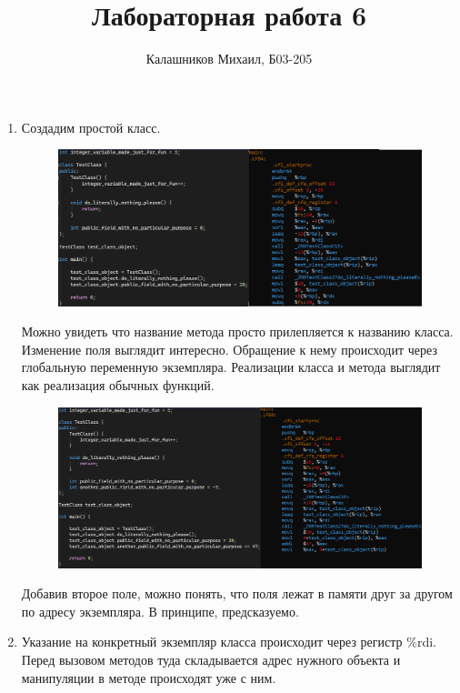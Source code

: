 \documentclass[a4paper,12pt]{article}
\title{Лабораторная работа 6}
\author{Калашников Михаил, Б03-205}
\date{}
\begin{document}

\begin{enumerate}

\setcounter{enumi}{0}

\item Создадим простой класс.

\begin{figure}[H]
  \centering
  \includegraphics[width=1\linewidth]{images/asm6_1.png}
\end{figure}

Можно увидеть что название метода просто прилепляется к названию класса. Изменение поля выглядит интересно. Обращение к нему происходит через глобальную переменную экземпляра. Реализации класса и метода выглядит как реализация обычных функций.

\begin{figure}[H]
  \centering
  \includegraphics[width=1\linewidth]{images/asm6_2.png}
\end{figure}

Добавив второе поле, можно понять, что поля лежат в памяти друг за другом по адресу экземпляра. В принципе, предсказуемо.

\item Указание на конкретный экземпляр класса происходит через регистр \%rdi. Перед вызовом методов туда складывается адрес нужного объекта и манипуляции в методе происходят уже с ним.


\end{enumerate}
\end{document}
